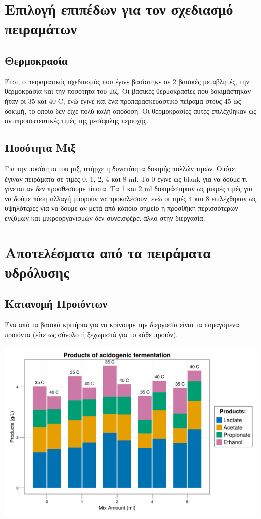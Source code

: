 \documentclass[11pt]{article}
\begin{document}
\section{Επιλογή επιπέδων για τον σχεδιασμό πειραμάτων}
\label{sec:org403370a}
\subsection{Θερμοκρασία}
\label{sec:orgcb42057}
Έτσι, ο πειραματικός σχεδιασμός που έγινε βασίστηκε σε 2 βασικές μεταβλητές, την θερμοκρασία και την ποσότητα του μιξ. Οι βασικές θερμοκρασίες που δοκιμάστηκαν ήταν οι 35 και 40 C, ενώ έγινε και ένα προπαρασκευαστικό πείραμα στους 45 ως δοκιμή, το οποίο δεν είχε πολύ καλή απόδοση. Οι θερμοκρασίες αυτές επιλέχθηκαν ως αντιπροσωπευτικές τιμές της μεσόφιλης περιοχής.

\subsection{Ποσότητα Μιξ}
\label{sec:org3043fc1}
Για την ποσότητα του μιξ, υπήρχε η δυνατότητα δοκιμής πολλών τιμών. Οπότε, έγιναν πειράματα σε τιμές 0, 1, 2, 4 και 8 ml. Το 0 έγινε ως blank για να δούμε τι γίνεται αν δεν προσθέσουμε τίποτα. Τα 1 και 2 ml δοκιμάστηκαν ως μικρές τιμές για να δούμε πόση αλλαγή μπορούν να προκαλέσουν, ενώ οι τιμές 4 και 8 επιλέχθηκαν ως υψηλότερες για να δούμε αν μετά από κάποιο σημείο η προσθήκη περισσότερων ενζύμων και μικροοργανισμών δεν συνεισφέρει άλλο στην διεργασία.  

\section{Αποτελέσματα από τα πειράματα υδρόλυσης}
\label{sec:orgdbc8f4a}
\subsection{Κατανομή Προιόντων}
\label{sec:orgd97311c}
Ένα από τα βασικά κριτήρια για να κρίνουμε την διεργασία είναι τα παραγόμενα προιόντα (είτε ως σύνολο ή ξεχωριστά για το κάθε προιόν).

\begin{center}
\includegraphics[width=.9\linewidth]{../plots/35_40_comp/final_products.png}
\end{center}
\end{document}
